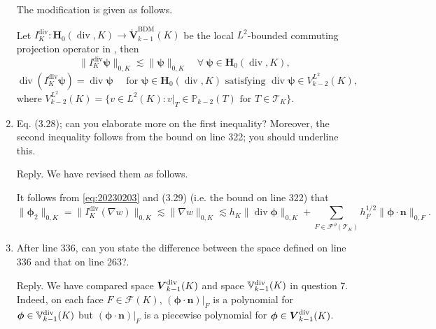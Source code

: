 \documentclass[10pt]{amsart}
\theoremstyle{definition}
\theoremstyle{remark}
\renewcommand{\div}{\operatorname{div}}
\begin{document}
\begin{enumerate}[1.]
The modification is given as follows.

Let $I_K^{\div}: \boldsymbol{H}_0(\div,K)\to\mathring{\boldsymbol{V}}_{k-1}^{\mathrm{BDM}}(K)$ be the local $L^2$-bounded commuting projection operator in \cite{ArnoldGuzman2021,FalkWinther2014}, then
\begin{equation}\label{eq:20230203}  
\|I_K^{\div}\boldsymbol{\psi}\|_{0,K} \lesssim \|\boldsymbol{\psi}\|_{0,K}\quad\forall~\boldsymbol{\psi}\in \boldsymbol{H}_0(\div,K),
\end{equation}
\[
\div(I_K^{\div}\boldsymbol{\psi})=\div\boldsymbol{\psi} \quad \textrm{ for } \boldsymbol{\psi}\in \boldsymbol{H}_0(\div,K) \textrm{ satisfying } \div\boldsymbol{\psi}\in V_{k-2}^{L^2}(K),
\]
where $
V_{k-2}^{L^2}(K)=\{v\in L^2(K): v|_{T}\in \mathbb P_{k-2}(T) \textrm{ for } T\in\mathcal T_K\}
$.

\medskip

\item \textsf{Eq. (3.28); can you elaborate more on the first inequality? Moreover, the second inequality follows from the bound on line 322; you should underline this.}

\smallskip \noindent \textcolor[rgb]{1.00,0.00,0.00}{Reply.}
We have revised them as follows.

It follows from \eqref{eq:20230203} and (3.29) (i.e. the bound on line 322) that
\begin{equation*}%
\|\boldsymbol{\phi}_2\|_{0,K}=\|I_K^{\div}(\nabla w)\|_{0,K}\lesssim \|\nabla w\|_{0,K}\lesssim h_K\|\div\boldsymbol{\phi}\|_{0,K} +\sum_{F\in\mathcal F^{\partial}(\mathcal T_K)}h_F^{1/2}\|\boldsymbol{\phi}\cdot\boldsymbol{n}\|_{0,F}.
\end{equation*}

\medskip

\item \textsf{After line 336, can you state the difference between the space defined on line 336 and that on line 263?.}

\smallskip \noindent \textcolor[rgb]{1.00,0.00,0.00}{Reply.}
We have compared space $\boldsymbol{V}_{k-1}^{\rm div}(K)$ and space $\mathbb{V}_{k-1}^{\rm div}(K)$ in question 7.
Indeed, on each face $F\in\mathcal F(K)$, $(\boldsymbol{\phi}\cdot\boldsymbol{n})|_F$ is a polynomial for $\boldsymbol{\phi}\in\mathbb{V}_{k-1}^{\rm div}(K)$ but $(\boldsymbol{\phi}\cdot\boldsymbol{n})|_F$ is a piecewise polynomial for $\boldsymbol{\phi}\in\boldsymbol{V}_{k-1}^{\rm div}(K)$.


\end{enumerate}
\end{document}
